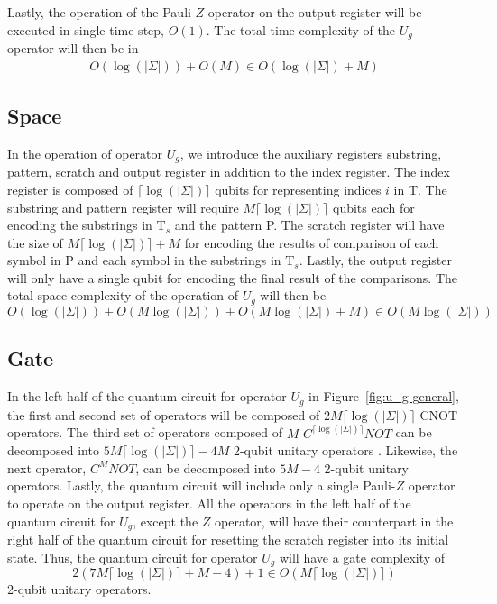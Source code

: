 Lastly, the operation of the Pauli-$Z$ operator on the output register will be executed in single time step, $O(1)$. The total time complexity of the $U_{g}$ operator will then be in 
\begin{align*}
O(\log(\vert\Sigma\vert)) + O(M) \in O(\log(\vert\Sigma\vert) + M)
\end{align*}

\subsection{Space}
In the operation of operator $U_{g}$, we introduce the auxiliary registers substring, pattern, scratch and output register in addition to the index register. The index register is composed of $\lceil\log(\vert\Sigma\vert)\rceil$ qubits for representing indices $i$ in T. The substring and pattern register will require $M\lceil\log(\vert\Sigma\vert)\rceil$ qubits each for encoding the substrings in $\text{T}_{s}$ and the pattern P. The scratch register will have the size of $M\lceil\log(\vert\Sigma\vert)\rceil + M$ for encoding the results of comparison of each symbol in P and each symbol in the substrings in $\text{T}_{s}$. Lastly, the output register will only have a single qubit for encoding the final result of the comparisons. The total space complexity of the operation of $U_{g}$ will then be
\begin{equation*}
	O(\log(\vert\Sigma\vert)) + O(M\log(\vert\Sigma\vert)) + O(M\log(\vert\Sigma\vert) + M) \in O(M\log(\vert\Sigma\vert))
\end{equation*}

\subsection{Gate}
In the left half of the quantum circuit for operator $U_{g}$ in Figure~\ref{fig:u_g-general}, the first and second set of operators will be composed of $2M\lceil\log(\vert\Sigma\vert)\rceil$ CNOT operators. The third set of operators composed of $M$ $C^{\lceil\log(\vert\Sigma\vert)\rceil}NOT$ can be decomposed into $5M\lceil\log(\vert\Sigma\vert)\rceil-4M$ 2-qubit unitary operators \cite{Chuang2000}. Likewise, the next operator, $C^{M}NOT$, can be decomposed into $5M-4$ 2-qubit unitary operators. Lastly, the quantum circuit will include only a single Pauli-$Z$ operator to operate on the output register. All the operators in the left half of the quantum circuit for $U_{g}$, except the $Z$ operator, will have their counterpart in the right half of the quantum circuit for resetting the scratch register into its initial state. Thus, the quantum circuit for operator $U_{g}$ will have a gate complexity of  
\begin{equation*}
	2(7M\lceil\log(\vert\Sigma\vert)\rceil + M - 4) + 1 \in O(M\lceil\log(\vert\Sigma\vert)\rceil) 
\end{equation*}
2-qubit unitary operators.

